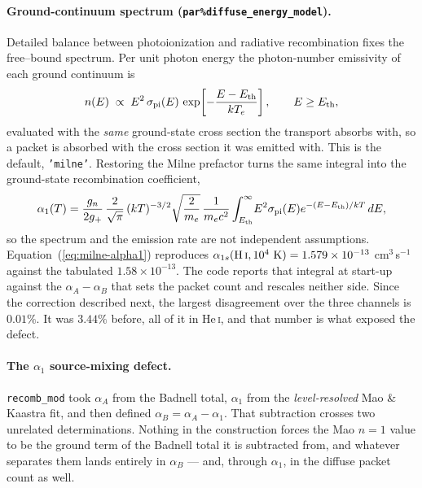 \documentclass[english,a4paper]{my_memo}
\newcommand{\code}[1]{\texttt{#1}}
\begin{document}
\paragraph{Ground-continuum spectrum (\code{par\%diffuse\_energy\_model}).}
Detailed balance between photoionization and radiative recombination fixes
the free--bound spectrum.  Per unit photon energy the photon-number
emissivity of each ground continuum is
\begin{equation}
 n(E)\;\propto\;E^2\,\sigma_{\rm pi}(E)\,
   \exp\!\left[-\frac{E-E_{\rm th}}{kT_e}\right],
 \qquad E\ge E_{\rm th},
 \label{eq:milne-pdf}
\end{equation}
evaluated with the \emph{same} ground-state cross section the transport
absorbs with, so a packet is absorbed with the cross section it was emitted
with.  This is the default, \code{'milne'}.  Restoring the Milne prefactor
turns the same integral into the ground-state recombination coefficient,
\begin{equation}
 \alpha_1(T)=\frac{g_n}{2g_+}\,\frac{2}{\sqrt{\pi}}\,(kT)^{-3/2}
   \sqrt{\frac{2}{m_e}}\,\frac{1}{m_ec^2}
   \int_{E_{\rm th}}^{\infty}\!E^2\sigma_{\rm pi}(E)
   e^{-(E-E_{\rm th})/kT}\,dE ,
 \label{eq:milne-alpha1}
\end{equation}
so the spectrum and the emission rate are not independent assumptions.
Equation~(\ref{eq:milne-alpha1}) reproduces
$\alpha_{1s}({\rm H\,\textsc{i}},10^4~{\rm K})=1.579\times10^{-13}$
cm$^3$\,s$^{-1}$ against the tabulated $1.58\times10^{-13}$.  The code
reports that integral at start-up against the $\alpha_A-\alpha_B$ that sets
the packet count and rescales neither side.  Since the correction described
next, the largest disagreement over the three channels is $0.01\%$.  It was
$3.44\%$ before, all of it in He\,\textsc{i}, and that number is what
exposed the defect.

\paragraph{The $\alpha_1$ source-mixing defect.}  \code{recomb\_mod} took
$\alpha_A$ from the Badnell total, $\alpha_1$ from the \emph{level-resolved}
Mao \& Kaastra fit, and then defined $\alpha_B = \alpha_A - \alpha_1$.  That
subtraction crosses two unrelated determinations.  Nothing in the
construction forces the Mao $n{=}1$ value to be the ground term of the
Badnell total it is subtracted from, and whatever separates them lands
entirely in $\alpha_B$ --- and, through $\alpha_1$, in the diffuse packet
count as well.
\end{document}
